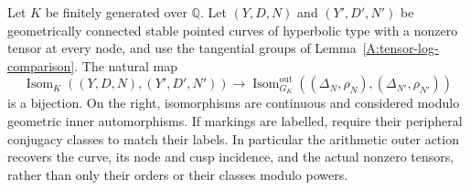 \begin{theorem}
\label{A:tangential-anabelian}
Let $K$ be finitely generated over $\mathbb Q$. Let
$(Y,D,N)$ and $(Y',D',N')$ be geometrically connected stable pointed
curves of hyperbolic type with a nonzero tensor at every node, and
use the tangential groups of Lemma~\ref{A:tensor-log-comparison}.
The natural map
\[
 \operatorname{Isom}_K((Y,D,N),(Y',D',N'))
 \longrightarrow
 \operatorname{Isom}_{G_K}^{\mathrm{out}}
 ((\Delta_N,\rho_N),(\Delta_{N'},\rho_{N'}))
\]
is a bijection. On the right, isomorphisms are continuous and considered
modulo geometric inner automorphisms. If markings are labelled,
require their peripheral conjugacy classes to match their labels.
In particular the arithmetic outer action recovers the curve, its
node and cusp incidence, and the actual nonzero tensors, rather than
only their orders or their classes modulo powers.
\end{theorem}

